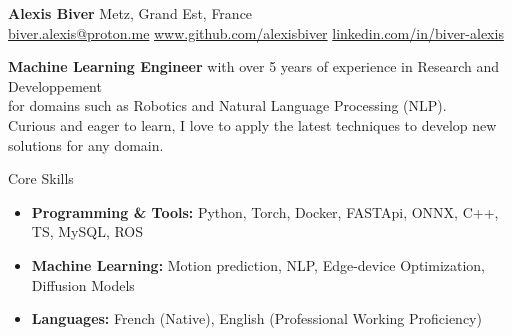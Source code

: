 \documentclass{resume} %
\begin{document}
\begin{center}
    {\Huge \textbf{Alexis Biver}} \hspace{5cm} Metz, Grand Est, France \\
    \href{mailto:biver.alexis@proton.me}{biver.alexis@proton.me}   \hspace{1cm}     \href{https://github.com/alexisbiver}{www.github.com/alexisbiver}  \hspace{1cm} \href{https://linkedin.com/in/biver-alexis}{linkedin.com/in/biver-alexis}
\end{center}

\vspace{0.5cm}
\begin{center}
\textbf{Machine Learning Engineer} with over 5 years of experience in Research and Developpement \\ for domains such as Robotics and Natural Language Processing (NLP). \\
Curious and eager to learn, I love to apply the latest techniques to develop new solutions for any domain.
\end{center}

\begin{rSection}{Core Skills}
\begin{itemize}
    \item \textbf{Programming \& Tools:} Python, Torch, Docker, FASTApi, ONNX, C++, TS, MySQL, ROS
    \item \textbf{Machine Learning:} Motion prediction, NLP, Edge-device Optimization, Diffusion Models
    \item \textbf{Languages:} French (Native), English (Professional Working Proficiency)
\end{itemize}
\end{rSection}
\end{document}

